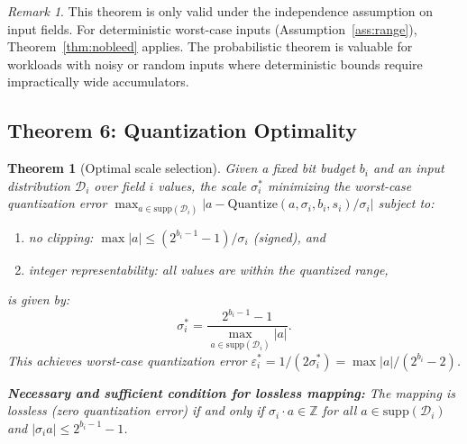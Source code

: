 \documentclass[11pt,a4paper]{article}
\theoremstyle{definition}
\theoremstyle{plain}
\newtheorem{theorem}{Theorem}[section]
\theoremstyle{remark}
\newtheorem{remark}{Remark}[section]
\newcommand{\Quantize}{\mathrm{Quantize}}
\begin{document}
\begin{remark}
This theorem is only valid under the independence assumption on input fields.  For deterministic worst-case inputs (Assumption~\ref{ass:range}), Theorem~\ref{thm:nobleed} applies.  The probabilistic theorem is valuable for workloads with noisy or random inputs where deterministic bounds require impractically wide accumulators.
\end{remark}

\subsection{Theorem 6: Quantization Optimality}
\label{sec:quant}

\begin{theorem}[Optimal scale selection]
\label{thm:quant}
Given a fixed bit budget $b_i$ and an input distribution $\mathcal{D}_i$ over field $i$ values, the scale $\sigma_i^*$ minimizing the worst-case quantization error $\max_{a\in\mathrm{supp}(\mathcal{D}_i)}|a - \Quantize(a,\sigma_i,b_i,s_i)/\sigma_i|$ subject to:
\begin{enumerate}
  \item[(a)] no clipping: $\max|a| \le (2^{b_i-1}-1)/\sigma_i$ (signed), and
  \item[(b)] integer representability: all values are within the quantized range,
\end{enumerate}
is given by:
\begin{equation}\label{eq:opt-sigma}
  \sigma_i^* = \frac{2^{b_i-1}-1}{\max_{a\in\mathrm{supp}(\mathcal{D}_i)}|a|}.
\end{equation}
This achieves worst-case quantization error $\varepsilon_i^* = 1/(2\sigma_i^*) = \max|a|/(2^{b_i}-2)$.

\textbf{Necessary and sufficient condition for lossless mapping:} The mapping is lossless (zero quantization error) if and only if $\sigma_i \cdot a \in \mathbb{Z}$ for all $a\in\mathrm{supp}(\mathcal{D}_i)$ and $|\sigma_i a|\le 2^{b_i-1}-1$.
\end{theorem}
\end{document}
